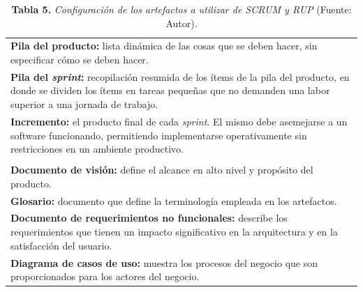 \FloatBarrier %
		\begin{table}[htb]
			\small
			\caption{\textbf{Tabla 5.} \textit{Configuraci\'{o}n de los artefactos a utilizar de SCRUM y RUP} (Fuente: Autor).}
			\centering
			\setlength{\extrarowheight}{\altocelda}
			\begin{tabulary}{\anchotabla}{|J|}
				\hline
				\\ \hline
				\textbf{Pila del producto: }lista din\'{a}mica de las cosas que se deben hacer, sin especificar c\'{o}mo se deben hacer.\\ \hline
				\textbf{Pila del \textit{sprint}:} recopilaci\'{o}n resumida de los \'{i}tems de la pila del producto, en donde se dividen los \'{i}tems en tareas peque\~{n}as que no demanden una labor superior a una jornada de trabajo.\\ \hline
				\textbf{Incremento: }el producto final de cada \textit{sprint}. El mismo debe asemejarse a un software funcionando, permitiendo implementarse operativamente sin restricciones en un ambiente productivo.\\ \hline
				\\ \hline
				\textbf{Documento de visi\'{o}n: }define el alcance en alto nivel y prop\'{o}sito del producto.\\
\hline
				\textbf{Glosario: }documento que define la terminolog\'{i}a empleada en los artefactos.\\ \hline
				\textbf{Documento de requerimientos no funcionales: }describe los requerimientos que tienen un impacto significativo en la arquitectura y en la satisfacci\'{o}n del usuario.\\ \hline
		\textbf{Diagrama de casos de uso: }muestra los procesos del negocio que son proporcionados para los actores del negocio.\\ \hline
			\end{tabulary}
		\end{table}
\FloatBarrier %